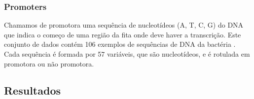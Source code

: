 \subsubsection{Promoters}
Chamamos de promotora uma sequência de nucleotídeos (A, T, C, G) do DNA 
que indica o começo de uma região da fita onde deve haver a transcrição. 
Este conjunto de dados contém 106 exemplos de sequências de DNA da 
bactéria . Cada sequência é formada por 57 variáveis,
que são nucleotídeos, e é rotulada em promotora ou não promotora.

\subsection{Resultados}

